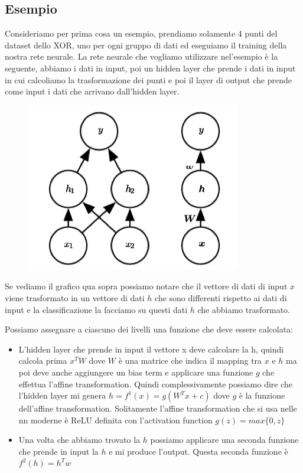 \documentclass[14pt]{extreport}
\begin{document}
\subsection{Esempio}

Consideriamo per prima cosa un esempio, prendiamo solamente 4 punti del dataset dello XOR, uno per ogni gruppo di dati ed eseguiamo il training della
nostra rete neurale. La rete neurale che vogliamo utilizzare nel'esempio è la seguente, abbiamo i dati in input, poi un hidden layer che prende i dati
in input in cui calcoliamo la trasformazione dei punti e poi il layer di output che prende come input i dati che arrivano dall'hidden layer.

\begin{figure}[H]
\centering
\includegraphics[width=0.7\linewidth]{356.jpeg}
\end{figure}

Se vediamo il grafico qua sopra possiamo notare che il vettore di dati di input $x$ viene trasformato in un vettore di dati $h$ che sono differenti
rispetto ai dati di input e la classificazione la facciamo su questi dati $h$ che abbiamo trasformato.

Possiamo assegnare a ciascuno dei livelli una funzione che deve essere calcolata:
\begin{itemize}
\item L'hidden layer che prende in input il vettore x deve calcolare la h, quindi calcola prima $x^TW$ dove $W$ è una matrice che indica il mapping
tra $x$ e $h$ ma poi deve anche aggiungere un bias term e applicare una funzione $g$ che effettua l'affine transformation. Quindi complessivamente
possiamo dire che l'hidden layer mi genera $h = f^1(x) = g(W^Tx+c)$ dove $g$ è la funzione dell'affine transformation. Solitamente l'affine
transformation che si usa nelle nn moderne è ReLU definita con l'activation function $g(z) = max\{0,z\}$
\item Una volta che abbiamo trovato la $h$ possiamo applicare una seconda funzione che prende in input la $h$ e mi produce l'output. Questa seconda
funzione è $f^2(h)=h^Tw$
\end{itemize}
\end{document}
